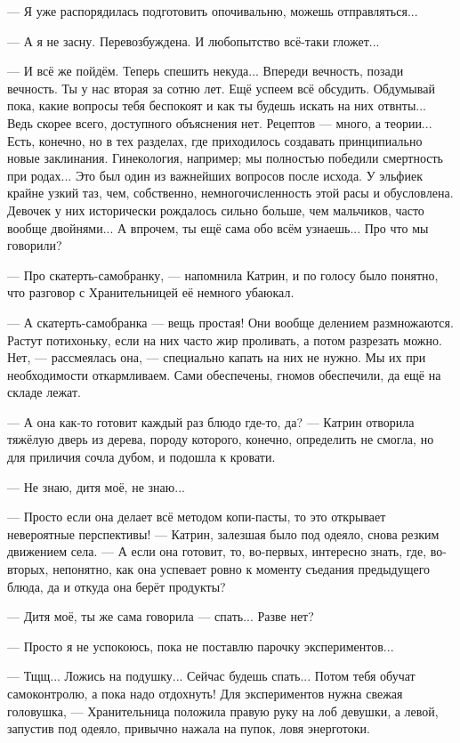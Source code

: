 --- Я уже распорядилась подготовить опочивальню, можешь отправляться...

--- А я не засну. Перевозбуждена. И любопытство всё-таки гложет...

--- И всё же пойдём. Теперь спешить некуда... Впереди вечность, позади вечность. Ты у нас вторая за сотню лет.
Ещё успеем всё обсудить. Обдумывай пока, какие вопросы тебя беспокоят и как ты будешь искать на них отвнты...
Ведь скорее всего, доступного объяснения нет.
Рецептов --- много, а теории... Есть, конечно, но в тех разделах, где приходилось создавать принципиально новые заклинания.
Гинекология, например; мы полностью победили смертность при родах... Это был один из важнейших вопросов после исхода.
У эльфиек крайне узкий таз, чем, собственно, немногочисленность этой расы и обусловлена.
Девочек у них исторически рождалось сильно больше, чем мальчиков, часто вообще двойнями...
А впрочем, ты ещё сама обо всём узнаешь... Про что мы говорили?

--- Про скатерть-самобранку, --- напомнила Катрин, и по голосу было понятно, что разговор с Хранительницей её немного убаюкал.

--- А скатерть-самобранка --- вещь простая! Они вообще делением размножаются. Растут потихоньку, если на них часто жир проливать,
а потом разрезать можно. Нет, --- рассмеялась она, --- специально капать на них не нужно.
Мы их при необходимости откармливаем. Сами обеспечены, гномов обеспечили, да ещё на складе лежат.

--- А она как-то готовит каждый раз блюдо где-то, да? --- Катрин отворила тяжёлую дверь из дерева, породу которого,
конечно, определить не смогла, но для приличия сочла дубом, и подошла к кровати.

--- Не знаю, дитя моё, не знаю...

--- Просто если она делает всё методом копи-пасты, то это открывает невероятные перспективы! ---
Катрин, залезшая было под одеяло, снова резким движением села. --- А если она готовит, то,
во-первых, интересно знать, где, во-вторых, непонятно, как она успевает ровно к моменту съедания предыдущего блюда,
да и откуда она берёт продукты?

--- Дитя моё, ты же сама говорила --- спать... Разве нет?

--- Просто я не успокоюсь, пока не поставлю парочку экспериментов...

--- Тщщ... Ложись на подушку... Сейчас будешь спать... Потом тебя обучат самоконтролю, а пока надо отдохнуть!
Для экспериментов нужна свежая головушка, --- Хранительница положила правую руку на лоб девушки,
а левой, запустив под одеяло, привычно нажала на пупок, ловя энерготоки.

